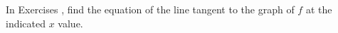 {\noindent In Exercises}
{, find the equation of the line tangent to the graph of $f$ at the indicated $x$ value.}
